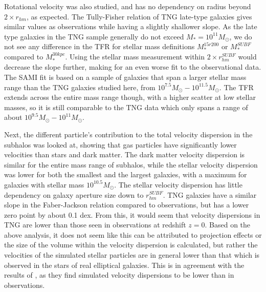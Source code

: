 Rotational velocity was also studied, and has no dependency on radius beyond $2 \times r_{hm}$, as expected. The Tully-Fisher relation of TNG late-type galaxies gives similar values as observations while having a slightly shallower slope. As the late type galaxies in the TNG sample generally do not exceed $M_\ast = 10^{11} M_{\odot}$, we do not see any difference in the TFR for stellar mass definitions $M_\ast^{15r200}$ or $M_\ast^{SUBF}$ compared to $M_\ast^{30kpc}$. Using the stellar mass measurement within $2 \times r_{hm}^{SUBF}$ would decrease the slope further, making for an even worse fit to the observational data. The SAMI fit is based on a sample of galaxies that span a larger stellar mass range than the TNG galaxies studied here, from $10^{7.5} M_{\odot} - 10^{11.5} M_{\odot}$. The TFR extends across the entire mass range though, with a higher scatter at low stellar masses, so it is still comparable to the TNG data which only spans a range of about $10^{9.5} M_{\odot} - 10^{11} M_{\odot}$. 


Next, the different particle's contribution to the total velocity dispersion in the subhalos was looked at, showing that gas particles have significantly lower velocities than stars and dark matter. The dark matter velocity dispersion is similar for the entire mass range of subhalos, while the stellar velocity dispersion was lower for both the smallest and the largest galaxies, with a maximum for galaxies with stellar mass $10^{10.5} M_\odot$. The stellar velocity dispersion has little dependency on galaxy aperture size down to $r^{SUBF}_{hm}$. TNG galaxies have a similar slope in the Faber-Jackson relation compared to observations, but has a lower zero point by about 0.1 dex.  From this, it would seem that velocity dispersions in TNG are lower than those seen in observations at redshift $z=0$. Based on the above analysis, it does not seem like this can be attributed to projection effects or the size of the volume within the velocity dispersion is calculated, but rather the velocities of the simulated stellar particles are in general lower than that which is observed in the stars of real elliptical galaxies. This is in agreement with the results of \textcite{Sande2018}, as they find simulated velocity dispersions to be lower than in observations. 


